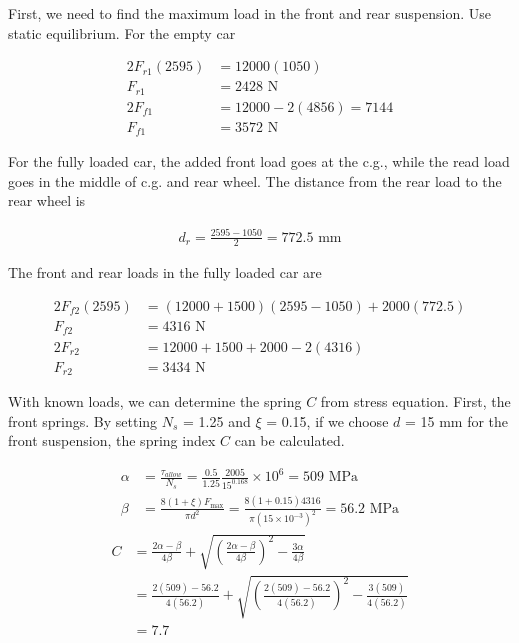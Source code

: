 \documentclass[a4paper,openany,nobib]{tufte-book}
\begin{document}
{{First, we need to find the maximum load in the front and rear
suspension. Use static equilibrium. For the empty car

$$\begin{aligned}
     2F_{r1}(2595) &= 12000(1050) \\
     F_{r1} &= 2428 \text{ N} \\
     2F_{f1} &= 12000 - 2(4856) = 7144 \\
     F_{f1} &= 3572 \text{ N}
   \end{aligned}$$

For the fully loaded car, the added front load goes at the c.g., while
the read load goes in the middle of c.g. and rear wheel. The distance
from the rear load to the rear wheel is

$$\begin{gathered}
     d_r = \frac{2595 - 1050}{2} = 772.5 \text{ mm}
   \end{gathered}$$

The front and rear loads in the fully loaded car are

$$\begin{aligned}
     2F_{f2}(2595) &= (12000 + 1500)(2595 - 1050) + 2000(772.5) \\
     F_{f2} &= 4316 \text{ N} \\
     2F_{r2} &= 12000 + 1500 + 2000 - 2(4316) \\
     F_{r2} &= 3434 \text{ N}
   \end{aligned}$$

With known loads, we can determine the spring \(C\) from stress equation.
First, the front springs. By setting \(N_s\) = 1.25 and \(\xi\) = 0.15, if
we choose \(d\) = 15 mm for the front suspension, the spring index \(C\) can
be calculated.

$$\begin{aligned}
    \alpha &= \frac{\tau_{allow}}{N_s} = \frac{0.5}{1.25}\frac{2005}{15^{0.168}} \times 10^6 = 509 \text{ MPa} \\ 
    \beta &= \frac{8(1 + \xi)F_{\max}}{\pi d^2} = \frac{8(1 + 0.15)4316}{\pi (15 \times 10^{-3})^2} = 56.2 \text{ MPa}
  \end{aligned}$$ $$\begin{aligned}
    C &= \frac{2\alpha  - \beta}{4\beta} + \sqrt {\left( \frac{2\alpha  - \beta}{4\beta} \right)^2 - \frac{3\alpha}{4\beta}}  \\ 
      & = \frac{2(509) - 56.2}{4(56.2)} + \sqrt {\left( \frac{2(509) - 56.2}{4(56.2)} \right)^2 - \frac{3(509)}{4(56.2)}}  \\ 
      &= 7.7 
  \end{aligned}$$

}}
\end{document}

